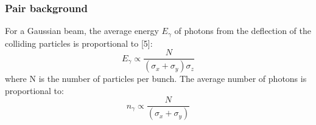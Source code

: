 \subsubsection{Pair background}
\label{BeamBeam:pairs}
For a Gaussian beam, the average energy $E_{\gamma}$ of photons from the deflection of the colliding particles is proportional to [5]:
\begin{equation}
 E_{\gamma} \propto \frac{N}{(\sigma_x+\sigma_y)\sigma_z}
 \label{eq:pair_energy}
\end{equation}
where N is the number of particles per bunch. The average number of photons is proportional to:
\begin{equation}
 n_{\gamma} \propto \frac{N}{(\sigma_x+\sigma_y)}
 \label{eq:pair_number}
\end{equation}

